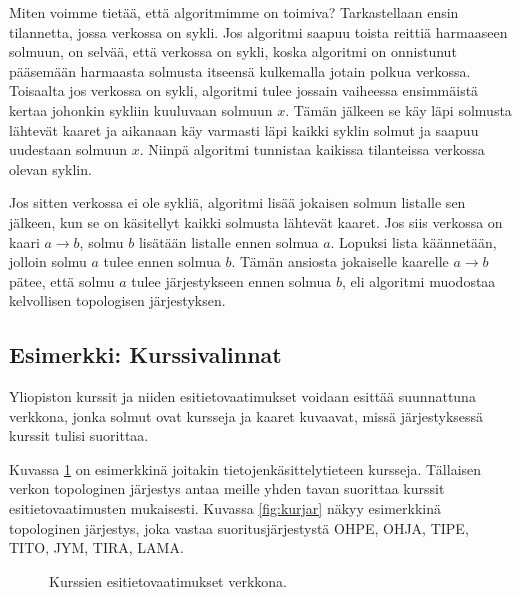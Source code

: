 Miten voimme tietää, että algoritmimme on toimiva?
Tarkastellaan ensin tilannetta, jossa verkossa on sykli.
Jos algoritmi saapuu toista reittiä harmaaseen solmuun,
on selvää, että verkossa on sykli,
koska algoritmi on onnistunut pääsemään harmaasta solmusta
itseensä kulkemalla jotain polkua verkossa.
Toisaalta jos verkossa on sykli, algoritmi tulee
jossain vaiheessa ensimmäistä kertaa johonkin sykliin
kuuluvaan solmuun $x$. Tämän jälkeen se käy läpi solmusta
lähtevät kaaret ja aikanaan käy varmasti läpi kaikki syklin
solmut ja saapuu uudestaan solmuun $x$.
Niinpä algoritmi tunnistaa kaikissa tilanteissa verkossa olevan syklin.

Jos sitten verkossa ei ole sykliä, algoritmi lisää jokaisen
solmun listalle sen jälkeen, kun se on käsitellyt
kaikki solmusta lähtevät kaaret.
Jos siis verkossa on kaari $a \rightarrow b$,
solmu $b$ lisätään listalle ennen solmua $a$.
Lopuksi lista käännetään, jolloin solmu $a$
tulee ennen solmua $b$.
Tämän ansiosta jokaiselle kaarelle $a \rightarrow b$ pätee,
että solmu $a$ tulee järjestykseen ennen solmua $b$,
eli algoritmi muodostaa kelvollisen topologisen järjestyksen.

\subsection{Esimerkki: Kurssivalinnat}

Yliopiston kurssit ja niiden esitietovaatimukset voidaan esittää 
suunnattuna verkkona, jonka solmut ovat kursseja ja kaaret kuvaavat,
missä järjestyksessä kurssit tulisi suorittaa.

Kuvassa \ref{fig:kuresi} on esimerkkinä joitakin
tietojenkäsittely\-tieteen kursseja.
Tällaisen verkon topologinen järjestys antaa meille
yhden tavan suorittaa kurssit esitietovaatimusten mukaisesti.
Kuvassa \ref{fig:kurjar} näkyy esimerkkinä topologinen järjestys,
joka vastaa suoritusjärjestystä
OHPE, OHJA, TIPE, TITO, JYM, TIRA, LAMA.

\begin{figure}
\center
\begin{center}
\end{center}
\caption{Kurssien esitietovaatimukset verkkona.}
\label{fig:kuresi}
\end{figure}


